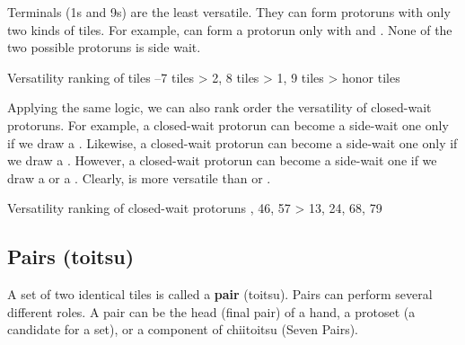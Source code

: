 \bigskip
Terminals (1s and 9s) are the least versatile. They can form protoruns with only two kinds of tiles. For example, {\large{}} can form a protorun only with {\large{}} and {\large{}}. None of the two possible protoruns is side wait. 

\begin{itembox}[c]{Versatility ranking of tiles}
--7 tiles > 2, 8 tiles > 1, 9 tiles > honor tiles
\end{itembox}

\bigskip
Applying the same logic, we can also rank order the versatility of closed-wait protoruns. 
For example, a closed-wait protorun {\large{}} can become a side-wait one only if we draw a {\large{}}. Likewise, a closed-wait protorun {\large{}} can become a side-wait one only if we draw a {\large{}}. However, a closed-wait protorun {\large{}} can become a side-wait one if we draw a {\large{}} or a {\large{}}. Clearly, {\large{}} is more versatile than {\large{}} or {\large{}}. 

\begin{itembox}[c]{Versatility ranking of closed-wait protoruns}
, 46, 57 > 13, 24, 68, 79
\end{itembox} 

\bigskip

\subsection{Pairs ({\jap toitsu})}\label{sec:closevers}
 

A set of two identical tiles is called a {\bf pair} ({\jap toitsu}). 
Pairs can perform several different roles. A pair can be the head (final pair) of a hand, a protoset (a candidate for a set), or a component of {\jap chiitoitsu} (Seven Pairs). 

\bigskip
